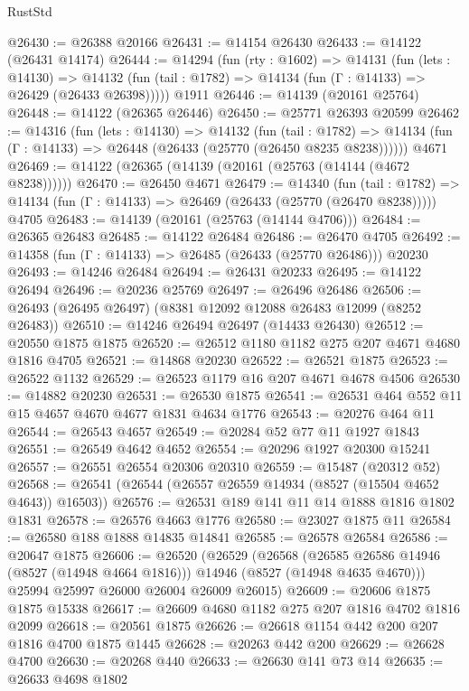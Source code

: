 \begin{lexlean}{RustStd}
\begin{coremodule}
@26430 := @26388 @20166
@26431 := @14154 @26430
@26433 := @14122 (@26431 @14174)
@26444 := @14294
    (fun (rty : @1602) =>
    @14131
      (fun (lets : @14130) =>
      @14132 (fun (tail : @1782) => @14134 (fun (Γ : @14133) => @26429 (@26433 @26398)))))
    @1911
@26446 := @14139 (@20161 @25764)
@26448 := @14122 (@26365 @26446)
@26450 := @25771 @26393 @20599
@26462 := @14316
    (fun (lets : @14130) =>
    @14132
      (fun (tail : @1782) =>
      @14134 (fun (Γ : @14133) => @26448 (@26433 (@25770 (@26450 @8235 @8238))))))
    @4671
@26469 := @14122 (@26365 (@14139 (@20161 (@25763 (@14144 (@4672 @8238))))))
@26470 := @26450 @4671
@26479 := @14340
    (fun (tail : @1782) => @14134 (fun (Γ : @14133) => @26469 (@26433 (@25770 (@26470 @8238)))))
    @4705
@26483 := @14139 (@20161 (@25763 (@14144 @4706)))
@26484 := @26365 @26483
@26485 := @14122 @26484
@26486 := @26470 @4705
@26492 := @14358 (fun (Γ : @14133) => @26485 (@26433 (@25770 @26486))) @20230
@26493 := @14246 @26484
@26494 := @26431 @20233
@26495 := @14122 @26494
@26496 := @20236 @25769
@26497 := @26496 @26486
@26506 := @26493 (@26495 @26497) (@8381 @12092 @12088 @26483 @12099 (@8252 @26483))
@26510 := @14246 @26494 @26497 (@14433 @26430)
@26512 := @20550 @1875 @1875
@26520 := @26512 @1180 @1182 @275 @207 @4671 @4680 @1816 @4705
@26521 := @14868 @20230
@26522 := @26521 @1875
@26523 := @26522 @1132
@26529 := @26523 @1179 @16 @207 @4671 @4678 @4506
@26530 := @14882 @20230
@26531 := @26530 @1875
@26541 := @26531 @464 @552 @11 @15 @4657 @4670 @4677 @1831 @4634 @1776
@26543 := @20276 @464 @11
@26544 := @26543 @4657
@26549 := @20284 @52 @77 @11 @1927 @1843
@26551 := @26549 @4642 @4652
@26554 := @20296 @1927 @20300 @15241
@26557 := @26551 @26554 @20306 @20310
@26559 := @15487 (@20312 @52)
@26568 := @26541 (@26544 (@26557 @26559 @14934 (@8527 (@15504 @4652 @4643)) @16503))
@26576 := @26531 @189 @141 @11 @14 @1888 @1816 @1802 @1831
@26578 := @26576 @4663 @1776
@26580 := @23027 @1875 @11
@26584 := @26580 @188 @1888 @14835 @14841
@26585 := @26578 @26584
@26586 := @20647 @1875
@26606 := @26520
    (@26529
      (@26568
        (@26585 @26586 @14946 (@8527 (@14948 @4664 @1816)))
        @14946
        (@8527 (@14948 @4635 @4670)))
      @25994
      @25997
      @26000
      @26004
      @26009
      @26015)
@26609 := @20606 @1875 @1875 @15338
@26617 := @26609 @4680 @1182 @275 @207 @1816 @4702 @1816 @2099
@26618 := @20561 @1875
@26626 := @26618 @1154 @442 @200 @207 @1816 @4700 @1875 @1445
@26628 := @20263 @442 @200
@26629 := @26628 @4700
@26630 := @20268 @440
@26633 := @26630 @141 @73 @14
@26635 := @26633 @4698 @1802

\end{coremodule}
\end{lexlean}
